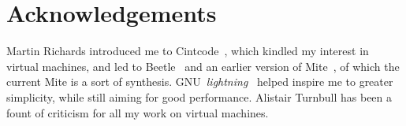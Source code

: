 \documentclass[english]{scrartcl}
\begin{document}
\section{Acknowledgements}

Martin Richards introduced me to Cintcode~\cite{cintweb}, which
kindled my interest in virtual machines, and led to
Beetle~\cite{beetledis} and an earlier version of Mite~\cite{mite0},
of which the current Mite is a sort of synthesis.
GNU~\emph{lightning}~\cite{lightning} helped inspire me to greater
simplicity, while still aiming for good performance. Alistair Turnbull
has been a fount of criticism for all my work on virtual machines.




\end{document}
